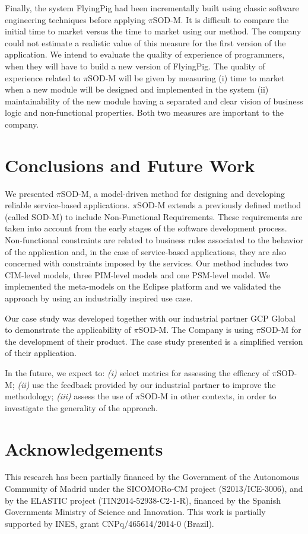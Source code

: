\documentclass{singlecol-new}
\theoremstyle{TH}{
\newtheorem{lemma}{Lemma}
\newtheorem{theorem}[lemma]{Theorem}
\newtheorem{corrolary}[lemma]{Corrolary}
\newtheorem{conjecture}[lemma]{Conjecture}
\newtheorem{proposition}[lemma]{Proposition}
\newtheorem{claim}[lemma]{Claim}
\newtheorem{stheorem}[lemma]{Wrong Theorem}
\newtheorem{algorithm}{Algorithm}
}
\theoremstyle{THrm}{
\newtheorem{definition}{Definition}[section]
\newtheorem{question}{Question}[section]
\newtheorem{remark}{Remark}
\newtheorem{scheme}{Scheme}
}
\theoremstyle{THhit}{
\newtheorem{case}{Case}[section]
}
\theoremstyle{THhsl}{
\newtheorem{example}{Example}
}
\newcommand{\pisodm}[0]{$\pi$SOD-M\xspace}
\begin{document}
Finally, the system FlyingPig had been incrementally built using classic software engineering techniques before applying $\pi$SOD-M. It is difficult to compare the initial time to market versus the time to market using our method. The company could not estimate a realistic value of this measure for the first version of the application. We intend to evaluate the quality of experience of programmers, when they will have to build a new version of FlyingPig. The quality of experience related to $\pi$SOD-M will be given by measuring (i) time to market when a new module will be designed and implemented in the system (ii) maintainability of the new module having a separated and clear vision of business logic and non-functional properties. Both two measures  are important to the company. 

\section{Conclusions and Future Work}\label{sec:conclusions}

We presented \pisodm, a model-driven method for designing and developing reliable service-based applications.
\pisodm extends a previously defined method (called SOD-M) to include Non-Functional Requirements.
These requirements are taken into account from the early stages of the software development process.
Non-functional constraints are related to business rules associated to the behavior of the application and, in the case of service-based applications, they are also concerned with constraints imposed by the services.
Our method includes two CIM-level models, three PIM-level models and one PSM-level model.
We implemented the meta-models on the Eclipse platform and we validated the approach by using an industrially inspired use case.

Our case study was developed together with our industrial partner GCP Global to demonstrate the applicability of \pisodm.
The Company is using \pisodm for the development of their product.
The case study presented is a simplified version of their application. 

In the future, we expect to:
\textit{(i)} select metrics for assessing the efficacy of \pisodm;
%
\textit{(ii)} use the feedback provided by our industrial partner to improve the methodology;
%
\textit{(iii)} assess the use of \pisodm in other contexts, in order to investigate the generality of the approach. 

\section*{Acknowledgements}
This research has been partially financed by the Government of the Autonomous Community of Madrid under the SICOMORo-CM project (S2013/ICE-3006), and by the ELASTIC project (TIN2014-52938-C2-1-R), financed by the Spanish Governments Ministry of Science and Innovation. 
This work is partially supported by INES, grant CNPq/465614/2014-0 (Brazil).




\end{document}
